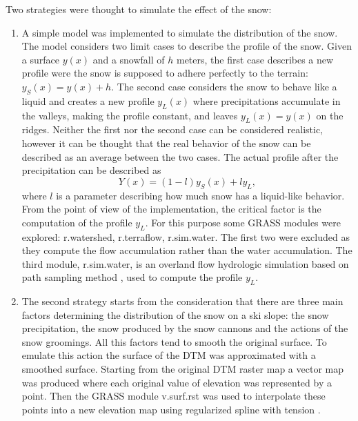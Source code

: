 \documentclass[12pt,a4paper,twoside]{book}
\begin{document}
Two strategies were thought to simulate the effect of the snow:
\begin{enumerate}
\item A simple model was implemented to simulate the distribution of the snow. The model considers two limit cases to describe the profile of the snow. Given a surface $y(x)$ and a snowfall of $h$ meters, the first case describes a new profile were the snow is supposed to adhere perfectly to the terrain: $y_S(x)=y(x)+h$. The second case considers the snow to behave like a liquid and creates a new profile $y_L(x)$ where precipitations accumulate in the valleys, making the profile constant, and leaves $y_L(x)=y(x)$ on the ridges. Neither the first nor the second case can be considered realistic, however it can be thought that the real behavior of the snow can be described as an average between the two cases. The actual profile after the precipitation can be described as
\begin{equation}
Y(x)=(1-l)y_S(x)+ly_L,
\end{equation}
where $l$ is a parameter describing how much snow has a liquid-like behavior. From the point of view of the implementation, the critical factor is the computation of the profile $y_L$. For this purpose some GRASS modules were explored: r.watershed, r.terraflow, r.sim.water. The first two were excluded as they compute the flow accumulation rather than the water accumulation. The third module, r.sim.water, is an overland flow hydrologic simulation based on path sampling method \cite{mit2004}, used to compute the profile $y_L$.
\item The second strategy  starts from the consideration that there are three main factors determining the distribution of the snow on a ski slope: the snow precipitation, the snow produced by the snow cannons and the actions of the snow groomings. All this factors tend to smooth the original surface. To emulate this action the surface of the DTM was approximated with a smoothed surface. Starting from the original DTM raster map a vector map was produced where each original value of elevation was represented by a point. Then the GRASS module v.surf.rst was used to interpolate these points into a new elevation map using regularized spline with tension \cite{mit2005}.
\end{enumerate}
\end{document}
